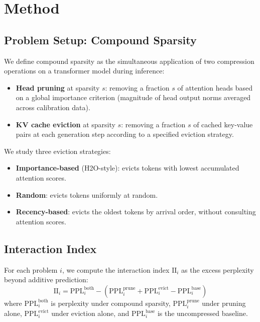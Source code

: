 \documentclass[11pt,a4paper]{article}
\begin{document}
\section{Method}

\subsection{Problem Setup: Compound Sparsity}

We define compound sparsity as the simultaneous application of two compression operations on a transformer model during inference:
\begin{itemize}
    \item \textbf{Head pruning} at sparsity $s$: removing a fraction $s$ of attention heads based on a global importance criterion (magnitude of head output norms averaged across calibration data).
    \item \textbf{KV cache eviction} at sparsity $s$: removing a fraction $s$ of cached key-value pairs at each generation step according to a specified eviction strategy.
\end{itemize}

We study three eviction strategies:
\begin{itemize}
    \item \textbf{Importance-based} (H2O-style): evicts tokens with lowest accumulated attention scores.
    \item \textbf{Random}: evicts tokens uniformly at random.
    \item \textbf{Recency-based}: evicts the oldest tokens by arrival order, without consulting attention scores.
\end{itemize}

\subsection{Interaction Index}

For each problem $i$, we compute the interaction index $\text{II}_i$ as the excess perplexity beyond additive prediction:
\begin{equation}
    \text{II}_i = \text{PPL}_{i}^{\text{both}} - \left(\text{PPL}_{i}^{\text{prune}} + \text{PPL}_{i}^{\text{evict}} - \text{PPL}_{i}^{\text{base}}\right)
\end{equation}
where $\text{PPL}_{i}^{\text{both}}$ is perplexity under compound sparsity, $\text{PPL}_{i}^{\text{prune}}$ under pruning alone, $\text{PPL}_{i}^{\text{evict}}$ under eviction alone, and $\text{PPL}_{i}^{\text{base}}$ is the uncompressed baseline.
\end{document}
